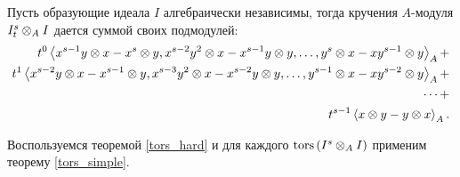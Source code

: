     \begin{Theorem}
        Пусть образующие идеала $I$ алгебраически независимы, тогда кручения $A$-модуля $I^s_t \otimes_A I$ дается суммой своих подмодулей:
        \begin{equation*}
            \begin{split}
                t^0\left<x^{s-1}y \otimes x - x^s\otimes y, x^{s-2}y^2\otimes x - x^{s-1}y\otimes y, \dots , y^s \otimes x - xy^{s - 1} \otimes y\right>_A + \\
                t^1\left<x^{s-2}y \otimes x - x^{s-1}\otimes y, x^{s-3}y^2\otimes x - x^{s-2}y\otimes y, \dots , y^{s-1} \otimes x - xy^{s - 2} \otimes y\right>_A + \\
                \dots + \\
                t^{s-1}\left<x\otimes y - y\otimes x\right>_A.
            \end{split}
        \end{equation*}
    \end{Theorem}
    \begin{Proof}
        Воспользуемся теоремой \ref{tors_hard} и для каждого $\textup{tors}\left(I^s \otimes_A I\right)$ применим теорему
        \ref{tors_simple}.
    \end{Proof}

